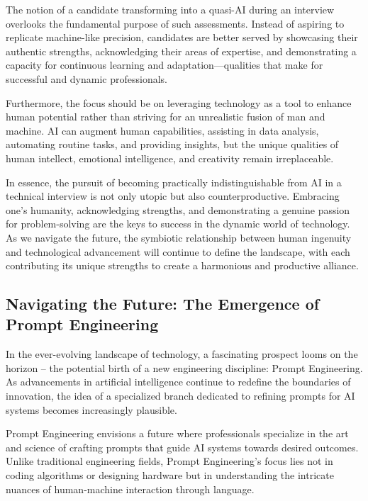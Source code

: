 \documentclass[
    a4paper, %
    10pt, %
    unnumberedsections, %
    twoside, %
]{LTJournalArticle}
\begin{document}
The notion of a candidate transforming into a quasi-AI during an interview overlooks the fundamental purpose of such assessments. Instead of aspiring to replicate machine-like precision, candidates are better served by showcasing their authentic strengths, acknowledging their areas of expertise, and demonstrating a capacity for continuous learning and adaptation—qualities that make for successful and dynamic professionals.

Furthermore, the focus should be on leveraging technology as a tool to enhance human potential rather than striving for an unrealistic fusion of man and machine. AI can augment human capabilities, assisting in data analysis, automating routine tasks, and providing insights, but the unique qualities of human intellect, emotional intelligence, and creativity remain irreplaceable.

In essence, the pursuit of becoming practically indistinguishable from AI in a technical interview is not only utopic but also counterproductive. Embracing one's humanity, acknowledging strengths, and demonstrating a genuine passion for problem-solving are the keys to success in the dynamic world of technology. As we navigate the future, the symbiotic relationship between human ingenuity and technological advancement will continue to define the landscape, with each contributing its unique strengths to create a harmonious and productive alliance.



\subsection{Navigating the Future: The Emergence of Prompt Engineering}

In the ever-evolving landscape of technology, a fascinating prospect looms on the horizon – the potential birth of a new engineering discipline: Prompt Engineering. As advancements in artificial intelligence continue to redefine the boundaries of innovation, the idea of a specialized branch dedicated to refining prompts for AI systems becomes increasingly plausible.

Prompt Engineering envisions a future where professionals specialize in the art and science of crafting prompts that guide AI systems towards desired outcomes. Unlike traditional engineering fields, Prompt Engineering's focus lies not in coding algorithms or designing hardware but in understanding the intricate nuances of human-machine interaction through language.
\end{document}
